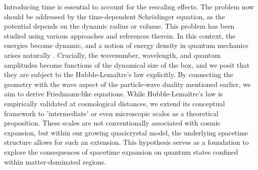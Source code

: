 \documentclass[sn-mathphys-num]{sn-jnl}%
\begin{document}
Introducing time is essential to account for the rescaling effects. The problem now should be addressed by the time-dependent Schr{\"o}dinger equation, as the potential depends on the dynamic radius or volume. This problem has been studied using various approaches \cite{Cooney} and references therein. In this context, the energies become dynamic, and a notion of energy density in quantum mechanics arises naturally \cite{francisco}. Crucially, the wavenumber, wavelength, and quantum amplitudes become functions of the dynamical size of the box, and we posit that they are subject to the Hubble-Lemaître's law explicitly. By connecting the geometry with the wave aspect of the particle-wave duality mentioned earlier, we aim to derive Friedmann-like equations. While Hubble-Lemaître's law is empirically validated at cosmological distances, we extend its conceptual framework to 'intermediate' or even microscopic scales as a theoretical proposition. These scales are not conventionally associated with cosmic expansion, but within our growing quasicrystal model, the underlying spacetime structure allows for such an extension. This hypothesis serves as a foundation to explore the consequences of spacetime expansion on quantum states confined within matter-dominated regions.
\end{document}
